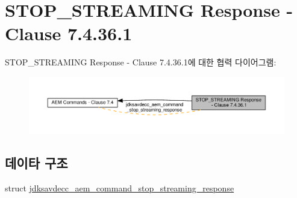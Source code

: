 \hypertarget{group__command__stop__streaming__response}{}\section{S\+T\+O\+P\+\_\+\+S\+T\+R\+E\+A\+M\+I\+NG Response -\/ Clause 7.4.36.1}
\label{group__command__stop__streaming__response}
S\+T\+O\+P\+\_\+\+S\+T\+R\+E\+A\+M\+I\+NG Response -\/ Clause 7.4.36.1에 대한 협력 다이어그램\+:
\nopagebreak
\begin{figure}[H]
\begin{center}
\leavevmode
\includegraphics[width=350pt]{group__command__stop__streaming__response}
\end{center}
\end{figure}
\subsection*{데이타 구조}
\begin{DoxyCompactItemize}
\item 
struct \hyperlink{structjdksavdecc__aem__command__stop__streaming__response}{jdksavdecc\+\_\+aem\+\_\+command\+\_\+stop\+\_\+streaming\+\_\+response}
\end{DoxyCompactItemize}
